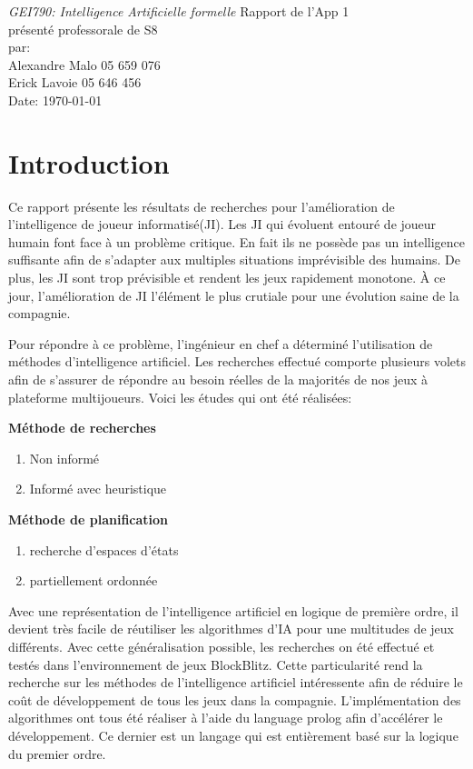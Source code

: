 \documentclass[12pt,english,frenchb,letterpaper]{article}
\begin{document}
\thispagestyle{empty}
\begin{center}
{\large\em GEI790:  Intelligence Artificielle formelle}
\vfill
Rapport de l'App 1\\
présenté professorale de S8\\
\vfill
par:\\
Alexandre Malo\hspace{2cm} 05 659 076\\
Erick Lavoie\hspace{2cm} 05 646 456\\
\vfill
Date: \today
\end{center}

\newpage
\onehalfspacing


\tableofcontents

\newpage


\section{Introduction}
Ce rapport présente les résultats de recherches pour l'amélioration de l'intelligence de joueur informatisé(JI).
Les JI qui évoluent entouré de joueur humain font face à un problème critique. En fait ils ne possède pas un intelligence suffisante afin de s'adapter aux multiples situations imprévisible des humains. De plus, les JI sont trop prévisible et rendent les jeux rapidement monotone. À ce jour, l'amélioration de JI l'élément le plus crutiale pour une évolution saine de la compagnie.

Pour répondre à ce problème, l'ingénieur en chef a déterminé l'utilisation de méthodes d'intelligence artificiel. Les recherches effectué comporte plusieurs volets afin de s'assurer de répondre au besoin réelles de la majorités de nos jeux à plateforme multijoueurs. Voici les études qui ont été réalisées:

\textbf{Méthode de recherches}
\begin{enumerate}
 \item Non informé
 \item Informé avec heuristique
\end{enumerate}

\textbf{Méthode de planification}
\begin{enumerate}
 \item recherche d'espaces d'états
 \item partiellement ordonnée
\end{enumerate}

Avec une représentation de l'intelligence artificiel en logique de première ordre, il devient très facile de réutiliser les algorithmes d'IA pour une multitudes de jeux différents. Avec cette généralisation possible, les recherches on été effectué et testés dans l'environnement de jeux BlockBlitz. Cette particularité rend la recherche sur les méthodes de l'intelligence artificiel intéressente afin de réduire le coût de développement de tous les jeux dans la compagnie. L'implémentation des algorithmes ont tous été réaliser à l'aide du language prolog afin d'accélérer le développement. Ce dernier est un langage qui est entièrement basé sur la logique du premier ordre.
\end{document}
